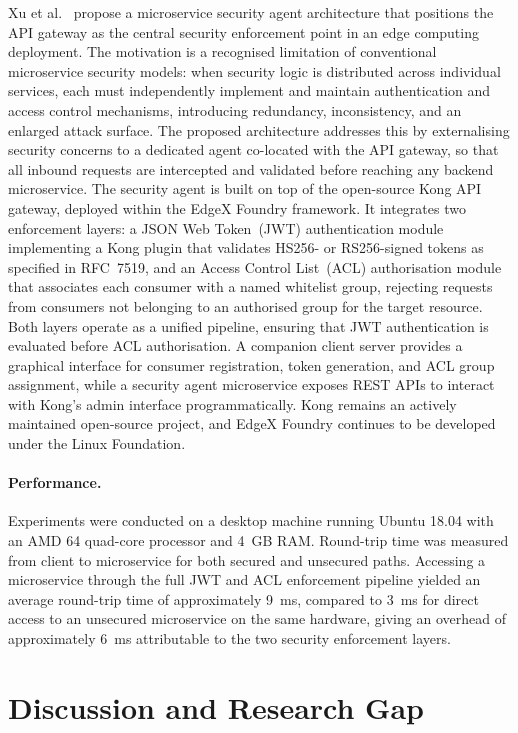 Xu et al.~\cite{xu2019} propose a microservice security agent architecture that positions the API gateway as the central security enforcement point in an edge computing deployment. The motivation is a recognised limitation of conventional microservice security models: when security logic is distributed across individual services, each must independently implement and maintain authentication and access control mechanisms, introducing redundancy, inconsistency, and an enlarged attack surface. The proposed architecture addresses this by externalising security concerns to a dedicated agent co-located with the API gateway, so that all inbound requests are intercepted and validated before reaching any backend microservice. The security agent is built on top of the open-source Kong API gateway, deployed within the EdgeX Foundry framework. It integrates two enforcement layers: a JSON Web Token~(JWT) authentication module implementing a Kong plugin that validates HS256- or RS256-signed tokens as specified in RFC~7519, and an Access Control List~(ACL) authorisation module that associates each consumer with a named whitelist group, rejecting requests from consumers not belonging to an authorised group for the target resource. Both layers operate as a unified pipeline, ensuring that JWT authentication is evaluated before ACL authorisation. A companion client server provides a graphical interface for consumer registration, token generation, and ACL group assignment, while a security agent microservice exposes REST APIs to interact with Kong's admin interface programmatically. Kong remains an actively maintained open-source project, and EdgeX Foundry continues to be developed under the Linux Foundation.

\paragraph{Performance.}
Experiments were conducted on a desktop machine running Ubuntu 18.04 with an AMD 64 quad-core processor and 4~GB RAM. Round-trip time was measured from client to microservice for both secured and unsecured paths. Accessing a microservice through the full JWT and ACL enforcement pipeline yielded an average round-trip time of approximately 9~ms, compared to 3~ms for direct access to an unsecured microservice on the same hardware, giving an overhead of approximately 6~ms attributable to the two security enforcement layers.

\section{Discussion and Research Gap}
\label{sec:soa_synthesis}

